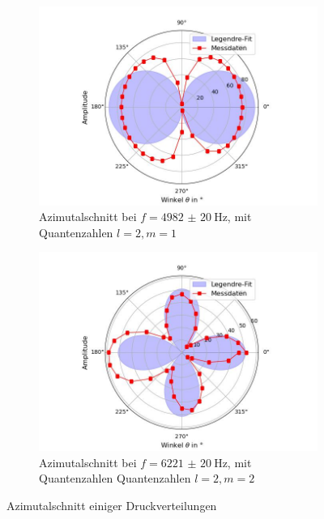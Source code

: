 \documentclass[../main.tex]{subfiles}
\begin{document}
\begin{figure}[H]
\begin{subfigure}[b]{0.45\textwidth}
                \label{fig:III_jk_Polschnitt_2263_1}
            \end{subfigure}
            \begin{subfigure}[b]{0.45\textwidth}
                \centering
                \includegraphics[width=\textwidth]{Bilddateien/Auswertung/III_jk_Polschnitt_3464_1.jpg}
                \caption{Azimutalschnitt bei $f=\SI{4982(20)}{\hertz}$, mit Quantenzahlen $l=2, m=1$}
                \label{fig:III_jk_Polschnitt_3464_1}
            \end{subfigure}
            \hfill
            \begin{subfigure}[b]{0.45\textwidth}
                \centering
                \includegraphics[width=\textwidth]{Bilddateien/Auswertung/III_jk_Polschnitt_3645_2.jpg}
                \caption{Azimutalschnitt bei $f=\SI{6221(20)}{\hertz}$, mit Quantenzahlen Quantenzahlen $l=2, m=2$
                }\label{fig:III_jk_Polschnitt_3645_2}

            \end{subfigure}
            \caption{Azimutalschnitt einiger Druckverteilungen}
            \label{fig:III_jk_Azimutalschnitte}
        \end{figure}
\end{document}

